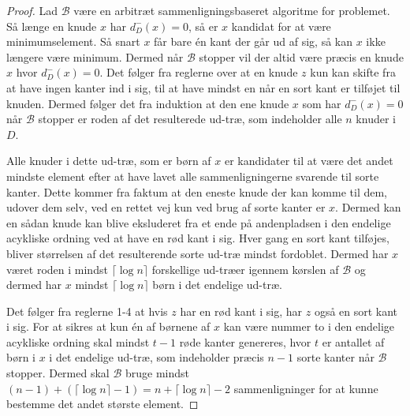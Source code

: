 \begin{proof}
	Lad $\mathcal{B}$ være en arbitræt sammenligningsbaseret algoritme for problemet. Så længe en knude $x$ har $d_{D}^{-}(x) = 0$, så er $x$ kandidat for at være minimumselement. Så snart $x$ får bare én kant der går ud af sig, så kan $x$ ikke længere være minimum. Dermed når $\mathcal{B}$ stopper vil der altid være præcis en knude $x$ hvor $d_{D}^{-}(x) = 0$. Det følger fra reglerne over at en knude $z$ kun kan skifte fra at have ingen kanter ind i sig, til at have mindst en når en sort kant er tilføjet til knuden. Dermed følger det fra induktion at den ene knude $x$ som har $d_{D}^{-}(x) = 0$ når $\mathcal{B}$ stopper er roden af det resulterede ud-træ, som indeholder alle $n$ knuder i $D$.

	Alle knuder i dette ud-træ, som er børn af $x$ er kandidater  til at være det andet mindste element efter at have lavet alle sammenligningerne svarende til sorte kanter. Dette kommer fra faktum at den eneste knude der kan komme til dem, udover dem selv, ved en rettet vej kun ved brug af sorte kanter er $x$. Dermed kan en sådan knude kan blive eksluderet fra et ende på andenpladsen i den endelige acykliske ordning ved at have en rød kant i sig. Hver gang en sort kant tilføjes, bliver størrelsen af det resulterende sorte ud-træ mindst fordoblet. Dermed har $x$ været roden i mindst $\lceil \log n \rceil$ forskellige ud-træer igennem kørslen af $\mathcal{B}$ og dermed har $x$ mindst $\lceil \log n \rceil$ børn i det endelige ud-træ.

	Det følger fra reglerne 1-4 at hvis $z$ har en rød kant i sig, har $z$ også en sort kant i sig. For at sikres at kun én af børnene af $x$ kan være nummer to i den endelige acykliske ordning skal mindst $t-1$ røde kanter genereres, hvor $t$ er antallet af børn i $x$ i det endelige ud-træ, som indeholder præcis $n-1$ sorte kanter når $\mathcal{B}$ stopper. Dermed skal $\mathcal{B}$ bruge mindst $(n-1) + (\lceil \log n \rceil -1) = n + \lceil \log n \rceil -2$ sammenligninger for at kunne bestemme det andet største element.
\end{proof}





